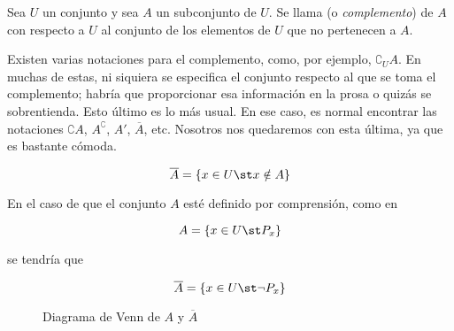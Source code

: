 



Sea $U$ un conjunto y sea $A$ un subconjunto de $U$. Se llama
 (o \emph{complemento}) de $A$ con respecto a $U$ al
conjunto de los elementos de $U$ que no pertenecen a $A$.

Existen varias notaciones para el complemento, como, por ejemplo,
$\complement_U A$. En muchas de estas, ni siquiera se especifica el conjunto
respecto al que se toma el complemento; habría que proporcionar esa
información en la prosa o quizás se sobrentienda. Esto último es lo más
usual. En ese caso, es normal encontrar las notaciones $\complement A$,
$A^\complement$, $A'$, $\overline{A}$, etc. Nosotros nos quedaremos con esta
última, ya que es bastante cómoda.

$$ \overline{A} = \{x \in U \st x \notin A\} $$

En el caso de que el conjunto $A$ esté definido por comprensión, como en

$$ A = \{x \in U \st P_x\} $$

\noindent se tendría que

$$ \overline{A} = \{x \in U \st \neg P_x\} $$


\begin{figure}
  \centering
 \caption{Diagrama de Venn de $A$ y $\overline{A}$}
\end{figure}

